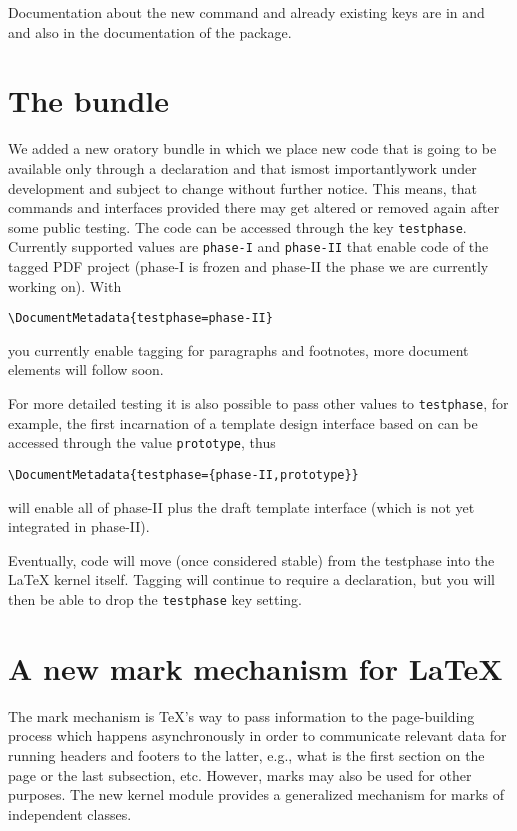\documentclass{ltnews}
\providecommand\Dash {\unskip \textemdash}
\begin{document}
Documentation about the new command and
already existing keys are in  and 
and also in the documentation of the  package.


\section{The  bundle}

We added a new oratory bundle in which we place new
code that is going to be available only through a
 declaration and that is\Dash most
importantly\Dash work under development and subject to
change without further notice. This means, that commands and interfaces provided there may
get altered or removed again after some public testing.  The code can
be accessed through the  key \texttt{testphase}.
Currently supported values are \texttt{phase-I} and \texttt{phase-II}
that enable code of the tagged PDF project (phase-I is frozen and
phase-II the phase we are currently working on).  With
\begin{verbatim}
\DocumentMetadata{testphase=phase-II}
\end{verbatim}
you currently enable tagging for paragraphs and footnotes, more
document elements will follow soon.

For more detailed testing it is also possible to pass other values to
\texttt{testphase}, for example, the first incarnation of a template
design interface based on  can be accessed through the
value \texttt{prototype}, thus
\begin{verbatim}
\DocumentMetadata{testphase={phase-II,prototype}}
\end{verbatim}
will enable all of phase-II plus the draft template interface (which
is not yet integrated in phase-II).

Eventually, code will move (once considered stable) from the
testphase into the \LaTeX{} kernel itself. Tagging will continue to
require a  declaration, but you will then be able
to drop the \texttt{testphase} key setting.


\section{A new mark mechanism for \LaTeX{}}

The mark mechanism is \TeX{}'s way to pass information to the
page-building process which happens asynchronously in order to
communicate relevant data for running headers and footers to the
latter, e.g., what is the first section on the page or the last
subsection, etc. However, marks may also be
used for other purposes. The new kernel module provides a generalized
mechanism for marks of independent classes.
\end{document}
